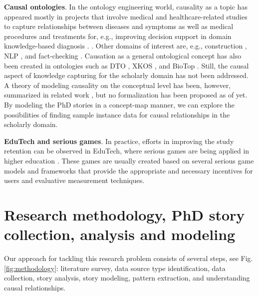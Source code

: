 \documentclass[sigconf]{acmart}
\begin{document}
\medskip
\noindent \textbf{Causal ontologies}.
In the ontology engineering world, causality as a topic has appeared mostly in projects that involve medical and healthcare-related studies \cite{DBLP:conf/ichi/YinPHTCSH20} to capture relationships between diseases and symptoms as well as medical procedures and treatments for, e.g., improving decision support in domain knowledge-based diagnosis \cite{Hong2021}. \cite{DBLP:conf/compsac/HuK20}. 
Other domains of interest are, e.g., construction \cite{9440633}, 
NLP \cite{9375954}, and fact-checking \cite{doi:10.1061/(ASCE)LA.1943-4170.0000489}. %
Causation as a general ontological concept has also been created in ontologies such as DTO \cite{HamdanAl-Hakam2019Aomf}, XKOS \cite{DBLP:conf/semweb/GillmanCJ13}, and BioTop \cite{DBLP:journals/ao/BeisswangerSSH08}. Still, the causal aspect of knowledge capturing for the scholarly domain has not been addressed. A theory of modeling causality on the conceptual level has been, however, summarized in related work \cite{DBLP:conf/jowo/Mizoguchi20}, but no formalization has been proposed as of yet. By modeling the PhD stories in a concept-map manner, we can explore the possibilities of finding sample instance data for causal relationships in the scholarly domain.



\medskip
\noindent \textbf{EduTech and serious games}.
In practice, efforts in improving the study retention can be observed in EduTech, where serious games are being applied in higher education \cite{ince}. These games are usually created based on several serious game models and frameworks that provide the appropriate and necessary incentives for users and evaluative measurement techniques.

\section{Research methodology, PhD story collection, analysis and modeling}
Our %
approach for tackling this research problem consists of several steps, see Fig. \ref{fig:methodology}: literature survey, data source type identification, data collection, story analysis, story modeling, pattern extraction, and understanding causal relationships. 
\end{document}
